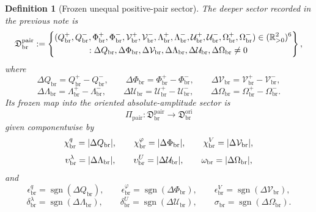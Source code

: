 \documentclass[11pt]{article}
\newcommand{\OriginSector}{\mathfrak D_{\mathrm{br}}^{\mathrm{ori}}}
\newcommand{\AbsReadAmp}{\chi_{\mathrm{br}}^{q}}
\newcommand{\AbsCovAmp}{\chi_{\mathrm{br}}^{\varphi}}
\newcommand{\AbsRelaxAmp}{\chi_{\mathrm{br}}^{V}}
\newcommand{\AbsWellAmp}{\upsilon_{\mathrm{br}}^{\lambda}}
\newcommand{\AbsEqAmp}{\upsilon_{\mathrm{br}}^{U}}
\newcommand{\AbsScaleAmp}{\omega_{\mathrm{br}}}
\newcommand{\PolRead}{\epsilon_{\mathrm{br}}^{q}}
\newcommand{\PolCov}{\epsilon_{\mathrm{br}}^{\varphi}}
\newcommand{\PolRelax}{\epsilon_{\mathrm{br}}^{V}}
\newcommand{\PolWell}{\delta_{\mathrm{br}}^{\lambda}}
\newcommand{\PolEq}{\delta_{\mathrm{br}}^{U}}
\newcommand{\PolScale}{\sigma_{\mathrm{br}}}
\newcommand{\PairSector}{\mathfrak D_{\mathrm{br}}^{\mathrm{pair}}}
\newcommand{\PairMap}{\Pi_{\mathrm{pair}}}
\newcommand{\PairReadPlus}{Q_{\mathrm{br}}^{+}}
\newcommand{\PairReadMinus}{Q_{\mathrm{br}}^{-}}
\newcommand{\PairCovPlus}{\Phi_{\mathrm{br}}^{+}}
\newcommand{\PairCovMinus}{\Phi_{\mathrm{br}}^{-}}
\newcommand{\PairRelaxPlus}{\mathcal V_{\mathrm{br}}^{+}}
\newcommand{\PairRelaxMinus}{\mathcal V_{\mathrm{br}}^{-}}
\newcommand{\PairWellPlus}{\Lambda_{\mathrm{br}}^{+}}
\newcommand{\PairWellMinus}{\Lambda_{\mathrm{br}}^{-}}
\newcommand{\PairEqPlus}{\mathcal U_{\mathrm{br}}^{+}}
\newcommand{\PairEqMinus}{\mathcal U_{\mathrm{br}}^{-}}
\newcommand{\PairScalePlus}{\Omega_{\mathrm{br}}^{+}}
\newcommand{\PairScaleMinus}{\Omega_{\mathrm{br}}^{-}}
\newcommand{\GapRead}{\Delta Q_{\mathrm{br}}}
\newcommand{\GapCov}{\Delta \Phi_{\mathrm{br}}}
\newcommand{\GapRelax}{\Delta \mathcal V_{\mathrm{br}}}
\newcommand{\GapWell}{\Delta \Lambda_{\mathrm{br}}}
\newcommand{\GapEq}{\Delta \mathcal U_{\mathrm{br}}}
\newcommand{\GapScale}{\Delta \Omega_{\mathrm{br}}}
\newtheorem{definition}{Definition}
\begin{document}
\begin{definition}[Frozen unequal positive-pair sector]
\label{def:pairsector}
The deeper sector recorded in the previous note is
\begin{equation}
\PairSector
:=
\left\{
\begin{aligned}
&(\PairReadPlus,\PairReadMinus,\PairCovPlus,\PairCovMinus,\PairRelaxPlus,\PairRelaxMinus,
\PairWellPlus,\PairWellMinus,\PairEqPlus,\PairEqMinus,\PairScalePlus,\PairScaleMinus)
\in(\mathbb R_{>0}^{2})^{6}
\\
&\hspace{3.8em}:\GapRead,\GapCov,\GapRelax,\GapWell,\GapEq,\GapScale\neq0
\end{aligned}
\right\},
\label{eq:pairsector}
\end{equation}
where
\begin{equation}
\GapRead=\PairReadPlus-\PairReadMinus,
\qquad
\GapCov=\PairCovPlus-\PairCovMinus,
\qquad
\GapRelax=\PairRelaxPlus-\PairRelaxMinus,
\label{eq:gapsA}
\end{equation}
\begin{equation}
\GapWell=\PairWellPlus-\PairWellMinus,
\qquad
\GapEq=\PairEqPlus-\PairEqMinus,
\qquad
\GapScale=\PairScalePlus-\PairScaleMinus.
\label{eq:gapsB}
\end{equation}
Its frozen map into the oriented absolute-amplitude sector is
\begin{equation}
\PairMap:\PairSector\longrightarrow\OriginSector
\label{eq:pairmap}
\end{equation}
given componentwise by
\begin{equation}
\AbsReadAmp=\abs{\GapRead},
\qquad
\AbsCovAmp=\abs{\GapCov},
\qquad
\AbsRelaxAmp=\abs{\GapRelax},
\label{eq:pairabsA}
\end{equation}
\begin{equation}
\AbsWellAmp=\abs{\GapWell},
\qquad
\AbsEqAmp=\abs{\GapEq},
\qquad
\AbsScaleAmp=\abs{\GapScale},
\label{eq:pairabsB}
\end{equation}
and
\begin{equation}
\PolRead=\operatorname{sgn}(\GapRead),
\qquad
\PolCov=\operatorname{sgn}(\GapCov),
\qquad
\PolRelax=\operatorname{sgn}(\GapRelax),
\label{eq:pairpolA}
\end{equation}
\begin{equation}
\PolWell=\operatorname{sgn}(\GapWell),
\qquad
\PolEq=\operatorname{sgn}(\GapEq),
\qquad
\PolScale=\operatorname{sgn}(\GapScale).
\label{eq:pairpolB}
\end{equation}
\end{definition}
\end{document}
